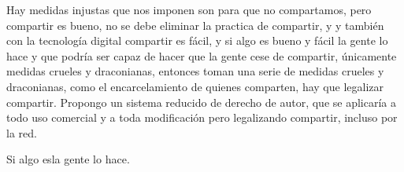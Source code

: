 \begin{multicols}{2}
Hay medidas injustas que nos imponen son para que no compartamos, pero compartir es bueno, no se debe eliminar la practica de compartir, y {\em {\color{introcolor}{ atacar la practica de compartir es atacar la sociedad, }}}y también con la tecnología digital compartir es fácil, y si algo es bueno y fácil la gente lo hace y que podría ser capaz de hacer que la gente cese de compartir, únicamente medidas crueles y draconianas, entonces toman una serie de medidas crueles y draconianas, como el encarcelamiento de quienes comparten, hay que legalizar compartir. Propongo un sistema reducido de derecho de autor, que se aplicaría a todo uso comercial y a toda modificación pero legalizando compartir, incluso por la red.

\begin{entradilla} %
Si algo es{\em {\color{introcolor}{ bueno y fácil }}}la gente lo hace.
\end{entradilla}



\end{multicols}
